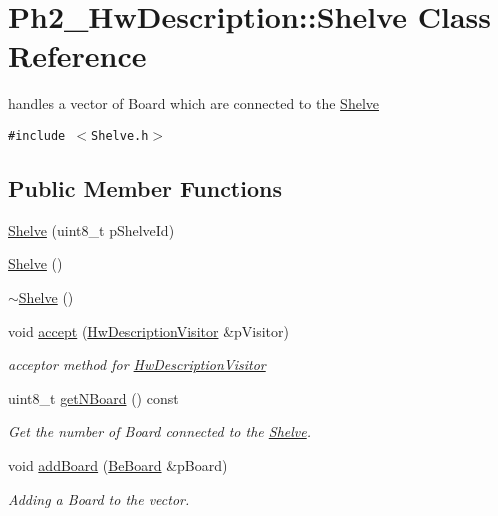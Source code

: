 \hypertarget{class_ph2___hw_description_1_1_shelve}{
\section{Ph2\_\-Hw\-Description::Shelve Class Reference}
\label{class_ph2___hw_description_1_1_shelve}
}
handles a vector of Board which are connected to the \hyperlink{class_ph2___hw_description_1_1_shelve}{Shelve}  


{\tt \#include $<$Shelve.h$>$}

\subsection*{Public Member Functions}
\begin{CompactItemize}
\item 
\hyperlink{class_ph2___hw_description_1_1_shelve_7e0361665ca7e4de8ce3fd1138ad1d86}{Shelve} (uint8\_\-t p\-Shelve\-Id)
\item 
\hyperlink{class_ph2___hw_description_1_1_shelve_b989c28364f9f94029dd02b3eb1d8241}{Shelve} ()
\item 
\hyperlink{class_ph2___hw_description_1_1_shelve_cbdc580d3ff8f4efe2df84d19ef6ef55}{$\sim$Shelve} ()
\item 
void \hyperlink{class_ph2___hw_description_1_1_shelve_c27ba0b5a780a71c7e8aaa05b785eab0}{accept} (\hyperlink{class_hw_description_visitor}{Hw\-Description\-Visitor} \&p\-Visitor)
\begin{CompactList}\small\item\em acceptor method for \hyperlink{class_hw_description_visitor}{Hw\-Description\-Visitor} \item\end{CompactList}\item 
uint8\_\-t \hyperlink{class_ph2___hw_description_1_1_shelve_15704e6b1f85ba4226b1f683707076ce}{get\-NBoard} () const 
\begin{CompactList}\small\item\em Get the number of Board connected to the \hyperlink{class_ph2___hw_description_1_1_shelve}{Shelve}. \item\end{CompactList}\item 
void \hyperlink{class_ph2___hw_description_1_1_shelve_a6ab700f126822c6da156760f130aba6}{add\-Board} (\hyperlink{class_ph2___hw_description_1_1_be_board}{Be\-Board} \&p\-Board)
\begin{CompactList}\small\item\em Adding a Board to the vector. \item\end{CompactList}\item 

\end{CompactItemize}
